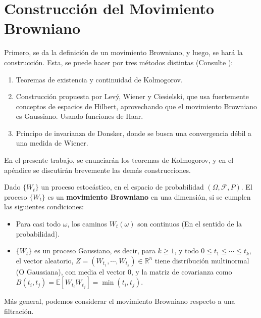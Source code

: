 \section{Construcción del Movimiento Browniano}

Primero, se da la definición de un movimiento Browniano, y luego, se hará la construcción. Esta, se puede hacer por tres métodos distintas (Consulte \cite{Brownian_Motion_Karatzas}):

\begin{enumerate}
	\item Teoremas de existencia y continuidad de Kolmogorov.
	\item Construcción propuesta por Levý, Wiener y Ciesielski, que usa fuertemente conceptos de espacios de Hilbert, aprovechando que el movimiento Browniano es Gaussiano. Usando funciones de Haar.
	\item Principo de invarianza de Donsker, donde se busca una convergencia débil a una medida de Wiener.
\end{enumerate}

En el presente trabajo, se enunciarán los teoremas de Kolmogorov, y en el apéndice se discutirán brevemente las demás construcciones.

\begin{boxDef}
	Dado $\{ W_t \}$ un proceso estocástico, en el espacio de probabilidad $(\Omega, \mathcal{F}, P)$. El proceso $\{ W_t \}$ es un \textbf{movimiento Browniano} en una dimensión, si se cumplen las siguientes condiciones:

	\begin{itemize}
		\item Para casi todo $\omega$, los caminos $W_t (\omega)$ son continuos (En el sentido de la probabilidad).
		\item $\{ W_t \}$ es un proceso Gaussiano, es decir, para $k \geq 1$, y todo $0 \leq t_1 \leq \cdots \leq t_k$, el vector aleatorio, $Z = (W_{t_1}, \cdots, W_{t_k}) \in \mathbb{R}^{n}$ tiene distribución multinormal (O Gaussiana), con media el vector $0$, y la matriz de covarianza como $B(t_i, t_j) = \mathbb{E}[W_{t_i} W_{t_j}] = \min(t_i, t_j)$.
	\end{itemize}

\end{boxDef}

Más general, podemos considerar el movimiento Browniano respecto a una filtración.


